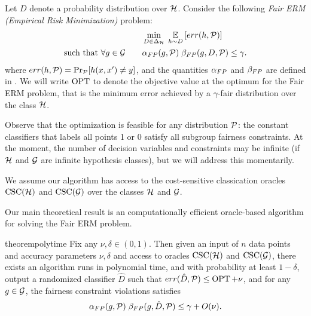 Let $D$ denote a probability distribution over $\mathcal{H}$. Consider the
following {\em Fair ERM (Empirical Risk Minimization)} problem:
\begin{align}
  &  \min_{D\in \Delta_{\mathcal{H}}}\; \operatorname*{\mathbb{E}}_{h\sim D}\left[err(h, \mathcal{P})\right]\\
  \mbox{such that } \forall g\in \mathcal{G} \qquad &
\alpha_{FP}(g, \mathcal{P}) \; \beta_{FP}(g, D, \mathcal{P}) \leq \gamma.
\end{align}
where $err(h, \mathcal{P}) = \Pr_{\mathcal{P}}[h(x, x') \neq y]$, and the quantities
$\alpha_{FP}$ and $\beta_{FP}$ are defined in .
We will write $\operatorname{OPT}$ to denote the objective value at the optimum for
the Fair ERM problem, that is the minimum error achieved by a
$\gamma$-fair distribution over the class $\mathcal{H}$.

Observe that the optimization is feasible for any distribution $\mathcal{P}$:
the constant classifiers that labels all points 1 or 0 satisfy all
subgroup fairness constraints. At the moment, the number of decision
variables and constraints may be infinite (if $\mathcal{H}$ and $\mathcal{G}$ are infinite hypothesis classes),
but we will address this momentarily.


\begin{assumpt}
  We assume our algorithm has access to the cost-sensitive
  classication oracles $\mathrm{CSC}(\mathcal{H})$ and $\mathrm{CSC}(\mathcal{G})$ over the classes
  $\mathcal{H}$ and $\mathcal{G}$.
\end{assumpt}



Our main theoretical result is an computationally efficient
oracle-based algorithm for solving the Fair ERM problem.


\begin{restatable}{theorem}{polytime}\label{thm:polytime}
  Fix any $\nu, \delta\in (0, 1)$. Then given an input of $n$ data
  points and accuracy parameters $\nu, \delta$ and access to oracles
  $\mathrm{CSC}(\mathcal{H})$ and $\mathrm{CSC}(\mathcal{G})$, there exists an algorithm runs in
  polynomial time, and with probability at least $1 - \delta$, output
  a randomized classifier $\hat D$ such that
  $err(\hat D, \mathcal{P}) \leq \operatorname{OPT} + \nu$, and for any $g\in \mathcal{G}$, the
  fairness constraint violations satisfies
  \[
    \alpha_{FP}(g, \mathcal{P}) \; \beta_{FP}(g, \hat D, \mathcal{P}) \leq \gamma + O(\nu).
  \]
\end{restatable}

